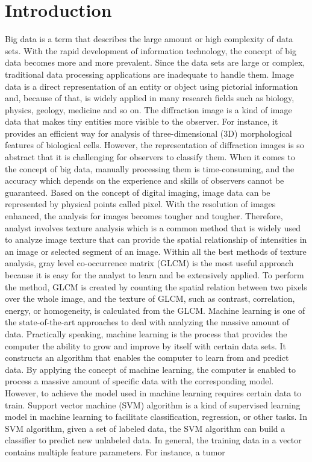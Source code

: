 
\renewcommand{\thechapter}{1}

\chapter{Introduction}

Big data is a term that describes the large amount or high complexity of data sets. With the rapid development of information technology, the concept of big data becomes more and more prevalent. Since the data sets are large or complex, traditional data processing applications are inadequate to handle them\cite{Snijders}. Image data is a direct representation of an entity or object using pictorial information and, because of that, is widely applied in many research fields such as biology, physics, geology, medicine and so on. The diffraction image is a kind of image data that makes tiny entities more visible to the observer. For instance, it provides an efficient way for analysis of three-dimensional (3D) morphological features of biological cells\cite{Brown}. However, the representation of diffraction images is so abstract that it is challenging for observers to classify them. When it comes to the concept of big data, manually processing them is time-consuming, and the accuracy which depends on the experience and skills of observers cannot be guaranteed. Based on the concept of digital imaging, image data can be represented by physical points called pixel\cite{Foley}. With the resolution of images enhanced, the analysis for images becomes tougher and tougher. Therefore, analyst involves texture analysis which is a common method that is widely used to analyze image texture that can provide the spatial relationship of intensities in an image or selected segment of an image\cite{Linda}. Within all the best methods of texture analysis, gray level co-occurrence matrix (GLCM) is the most useful approach because it is easy for the analyst to learn and be extensively applied\cite{Nanni}. To perform the method, GLCM is created by counting the spatial relation between two pixels over the whole image, and the texture of GLCM, such as contrast, correlation, energy, or homogeneity, is calculated from the GLCM. Machine learning is one of the state-of-the-art approaches to deal with analyzing the massive amount of data. Practically speaking, machine learning is the process that provides the computer the ability to grow and improve by itself with certain data sets\cite{Mitchell}. It constructs an algorithm that enables the computer to learn from and predict data\cite{Mehryar}. By applying the concept of machine learning, the computer is enabled to process a massive amount of specific data with the corresponding model. However, to achieve the model used in machine learning requires certain data to train. Support vector machine (SVM) algorithm is a kind of supervised learning model in machine learning to facilitate classification, regression, or other tasks\cite{Cortes}. In SVM algorithm, given a set of labeled data, the SVM algorithm can build a classifier to predict new unlabeled data. In general, the training data in a vector contains multiple feature parameters. For instance, a tumor 